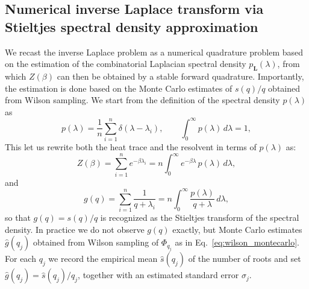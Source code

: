 \documentclass[10pt,aps,pre,twocolumn,nofootinbib,superscriptaddress,longbibliography]{revtex4-2}
\newcommand{\bL}{\mathbf{L}}
\begin{document}
\subsection{Numerical inverse Laplace transform via Stieltjes spectral density approximation}\label{app:stieltjes}
We recast the inverse Laplace problem as a numerical quadrature problem based on the estimation of the combinatorial Laplacian spectral density $p_{\bL}(\lambda)$, from which $Z(\beta)$ can then be obtained by a stable forward quadrature. 
Importantly, the estimation is done based on the Monte Carlo estimates of $s(q)/q$ obtained from Wilson sampling.
We start from the definition of the spectral density $p(\lambda)$ as
\begin{equation}
  p(\lambda) = \frac{1}{n}\sum_{i=1}^n \delta(\lambda-\lambda_i),
  \qquad \int_0^\infty p(\lambda)\,d\lambda = 1,
\end{equation}
This let us rewrite both the heat trace and the resolvent in terms of $p(\lambda)$ as:
\begin{equation}
  Z(\beta) = \sum_{i=1}^n e^{-\beta\lambda_i}
           = n \int_0^\infty e^{-\beta\lambda}\,p(\lambda)\,d\lambda,
\end{equation}
and
\begin{equation}\label{eq:stieltjes}
  g(q) = \sum_{i=1}^n \frac{1}{q+\lambda_i}
       = n \int_0^\infty \frac{p(\lambda)}{q+\lambda}\,d\lambda,
\end{equation}
so that $g(q)=s(q)/q$ is recognized as the Stieltjes transform of the spectral density. In practice we do not observe $g(q)$ exactly, but Monte Carlo estimates $\hat g(q_j)$ obtained from Wilson sampling of $\Phi_{q_j}$ as in Eq.~\ref{eq:wilson_montecarlo}.
For each $q_j$ we record the empirical mean $\hat s(q_j)$ of the number of roots and set $\hat g(q_j)=\hat s(q_j)/q_j$, together with an estimated standard error $\sigma_j$.
\end{document}
